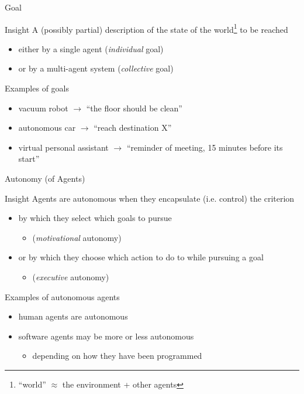\documentclass[presentation]{beamer}\mode<presentation>{\usetheme{AMSBolognaFC}}
\begin{document}
\begin{frame}[c]{Goal}
%
\begin{block}{Insight}
	A (possibly partial) description of the state of the world\footnote{``world'' $\approx$ the environment + other agents} to be reached
	\begin{itemize}
		\item either by a single agent (\emph{individual} goal)
		\item or by a multi-agent system (\emph{collective} goal)
	\end{itemize}
\end{block}
%
\begin{exampleblock}{Examples of goals}
	\begin{itemize}
		\item vacuum robot $\rightarrow$ ``the floor should be clean''
		\item autonomous car $\rightarrow$ ``reach destination X''
		\item virtual personal assistant $\rightarrow$ ``reminder of meeting, 15 minutes before its start''
	\end{itemize}
\end{exampleblock}
%
\end{frame}

\begin{frame}[c]{Autonomy (of Agents)}
%
\begin{block}{Insight}
	Agents are \alert{autonomous} when they encapsulate (i.e. control) the criterion
	\begin{itemize}
		\item by which they select which goals to pursue 
		\begin{itemize}
			\item (\emph{motivational} autonomy)
		\end{itemize}
		\item or by which they choose which action to do to while pursuing a goal 
		\begin{itemize}
			\item (\emph{executive} autonomy)
		\end{itemize}
	\end{itemize}
\end{block}
%
\begin{exampleblock}{Examples of autonomous agents}
	\begin{itemize}
		\item human agents are autonomous
		\item software agents may be more or less autonomous 
		\begin{itemize}
			\item depending on how they have been programmed
		\end{itemize}
	\end{itemize}
\end{exampleblock}
%
\end{frame}
\end{document}
